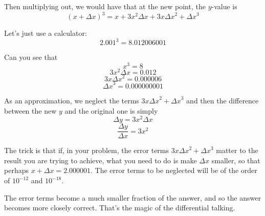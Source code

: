 \documentclass[11pt, oneside]{article}
\begin{document}
Then multiplying out, we would have that at the new point, the $y$-value is
\[ (x + \Delta x)^3 = x + 3 x^2 {\Delta x} + 3 x{\Delta x}^2 + {\Delta x}^3 \]

Let's just use a calculator:
\[ 2.001^3 = 8.012006001 \]

Can you see that 
\[ x^3 = 8 \]
\[ 3 x^2 {\Delta x} = 0.012 \]
\[ 3 x{\Delta x}^2 = 0.000006 \]
\[ {\Delta x}^3 = 0.000000001 \]

As an approximation, we neglect the terms $3 x{\Delta x}^2 + {\Delta x}^3$ and then the difference between the new $y$ and the original one is simply
\[  \Delta y = 3 x^2 {\Delta x}  \]
\[  \frac{\Delta y}{\Delta x}  = 3 x^2 \]

The trick is that if, in your problem, the error terms $3 x{\Delta x}^2 + {\Delta x}^3$ matter to the result you are trying to achieve, what you need to do is make $\Delta x$ smaller, so that perhaps $x + \Delta x = 2.000001$.  The error terms to be neglected will be of the order of $10^{-12}$ and $10^{-18}$.

The error terms become a much smaller fraction of the answer, and so the answer becomes more closely correct.  That's the magic of the differential talking.
\end{document}
